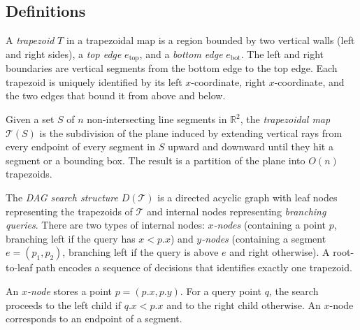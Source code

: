 \subsection{Definitions}

\begin{definition}[Trapezoid]\label{def:trapezoid}
A \emph{trapezoid} $T$ in a trapezoidal map is a region bounded by two vertical walls (left and right sides), a \emph{top edge} $e_{\text{top}}$, and a \emph{bottom edge} $e_{\text{bot}}$. The left and right boundaries are vertical segments from the bottom edge to the top edge. Each trapezoid is uniquely identified by its left $x$-coordinate, right $x$-coordinate, and the two edges that bound it from above and below.
\end{definition}

\begin{definition}\label{def:trapezoidal_map}
Given a set $S$ of $n$ non-intersecting line segments in $\mathbb{R}^2$, the \emph{trapezoidal map} $\mathcal{T}(S)$ is the subdivision of the plane induced by extending vertical rays from every endpoint of every segment in $S$ upward and downward until they hit a segment or a bounding box. The result is a partition of the plane into $O(n)$ trapezoids.
\end{definition}

\begin{definition}\label{def:dag_search}
The \emph{DAG search structure} $D(\mathcal{T})$ is a directed acyclic graph with leaf nodes representing the trapezoids of $\mathcal{T}$ and internal nodes representing \emph{branching queries}. There are two types of internal nodes: \emph{$x$-nodes} (containing a point $p$, branching left if the query has $x < p.x$) and \emph{$y$-nodes} (containing a segment $e = (p_1, p_2)$, branching left if the query is above $e$ and right otherwise). A root-to-leaf path encodes a sequence of decisions that identifies exactly one trapezoid.
\end{definition}

\begin{definition}[$x$-Node]\label{def:x_node}
An \emph{$x$-node} stores a point $p = (p.x, p.y)$. For a query point $q$, the search proceeds to the left child if $q.x < p.x$ and to the right child otherwise. An $x$-node corresponds to an endpoint of a segment.
\end{definition}

